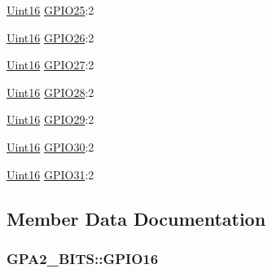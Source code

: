 \begin{DoxyCompactItemize}
\item 
\hyperlink{_d_s_p2833x___device_8h_a59a9f6be4562c327cbfb4f7e8e18f08b}{Uint16} \hyperlink{struct_g_p_a2___b_i_t_s_aae570fae8991fc006fb3b9f5c0eaf120}{G\+P\+I\+O25}\+:2
\item 
\hyperlink{_d_s_p2833x___device_8h_a59a9f6be4562c327cbfb4f7e8e18f08b}{Uint16} \hyperlink{struct_g_p_a2___b_i_t_s_ae4fa4270167996d8007a642976990cc2}{G\+P\+I\+O26}\+:2
\item 
\hyperlink{_d_s_p2833x___device_8h_a59a9f6be4562c327cbfb4f7e8e18f08b}{Uint16} \hyperlink{struct_g_p_a2___b_i_t_s_a0d372fdec8df1ab1359734b050761ad6}{G\+P\+I\+O27}\+:2
\item 
\hyperlink{_d_s_p2833x___device_8h_a59a9f6be4562c327cbfb4f7e8e18f08b}{Uint16} \hyperlink{struct_g_p_a2___b_i_t_s_a371055b5684b12b54ac797367b24743f}{G\+P\+I\+O28}\+:2
\item 
\hyperlink{_d_s_p2833x___device_8h_a59a9f6be4562c327cbfb4f7e8e18f08b}{Uint16} \hyperlink{struct_g_p_a2___b_i_t_s_a36673659ad7e911860e50df8ce5221fd}{G\+P\+I\+O29}\+:2
\item 
\hyperlink{_d_s_p2833x___device_8h_a59a9f6be4562c327cbfb4f7e8e18f08b}{Uint16} \hyperlink{struct_g_p_a2___b_i_t_s_a19fb51642598c9b21cb79eff2c09c929}{G\+P\+I\+O30}\+:2
\item 
\hyperlink{_d_s_p2833x___device_8h_a59a9f6be4562c327cbfb4f7e8e18f08b}{Uint16} \hyperlink{struct_g_p_a2___b_i_t_s_ae4a1fb2e1a0aec4792812fbd35f72a71}{G\+P\+I\+O31}\+:2
\end{DoxyCompactItemize}


\subsection{Member Data Documentation}
\hypertarget{struct_g_p_a2___b_i_t_s_a461a9315ae7ce63640cc0ba48be955f5}{}
\subsubsection[{G\+P\+I\+O16}]{ G\+P\+A2\+\_\+\+B\+I\+T\+S\+::\+G\+P\+I\+O16}\label{struct_g_p_a2___b_i_t_s_a461a9315ae7ce63640cc0ba48be955f5}
\hypertarget{struct_g_p_a2___b_i_t_s_a9c5bf62bcb32ff8b1793c41dd5adc143}{}
